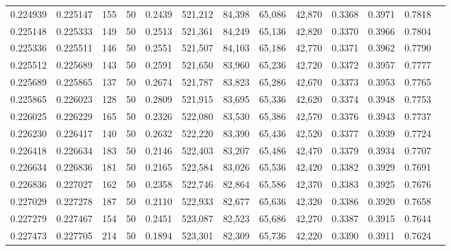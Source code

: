 \begin{tabular}{rrrrrrrrrrrrr}
0.224939 & 0.225147 &   155 &  50 &                                     0.2439 & 521,212 &  84,398 &  65,086 &  42,870 & 0.3368 & 0.3971 & 0.7818 \\
0.225148 & 0.225333 &   149 &  50 &                                     0.2513 & 521,361 &  84,249 &  65,136 &  42,820 & 0.3370 & 0.3966 & 0.7804 \\
0.225336 & 0.225511 &   146 &  50 &                                     0.2551 & 521,507 &  84,103 &  65,186 &  42,770 & 0.3371 & 0.3962 & 0.7790 \\
0.225512 & 0.225689 &   143 &  50 &                                     0.2591 & 521,650 &  83,960 &  65,236 &  42,720 & 0.3372 & 0.3957 & 0.7777 \\
0.225689 & 0.225865 &   137 &  50 &                                     0.2674 & 521,787 &  83,823 &  65,286 &  42,670 & 0.3373 & 0.3953 & 0.7765 \\
0.225865 & 0.226023 &   128 &  50 &                                     0.2809 & 521,915 &  83,695 &  65,336 &  42,620 & 0.3374 & 0.3948 & 0.7753 \\
0.226025 & 0.226229 &   165 &  50 &                                     0.2326 & 522,080 &  83,530 &  65,386 &  42,570 & 0.3376 & 0.3943 & 0.7737 \\
0.226230 & 0.226417 &   140 &  50 &                                     0.2632 & 522,220 &  83,390 &  65,436 &  42,520 & 0.3377 & 0.3939 & 0.7724 \\
0.226418 & 0.226634 &   183 &  50 &                                     0.2146 & 522,403 &  83,207 &  65,486 &  42,470 & 0.3379 & 0.3934 & 0.7707 \\
0.226634 & 0.226836 &   181 &  50 &                                     0.2165 & 522,584 &  83,026 &  65,536 &  42,420 & 0.3382 & 0.3929 & 0.7691 \\
0.226836 & 0.227027 &   162 &  50 &                                     0.2358 & 522,746 &  82,864 &  65,586 &  42,370 & 0.3383 & 0.3925 & 0.7676 \\
0.227029 & 0.227278 &   187 &  50 &                                     0.2110 & 522,933 &  82,677 &  65,636 &  42,320 & 0.3386 & 0.3920 & 0.7658 \\
0.227279 & 0.227467 &   154 &  50 &                                     0.2451 & 523,087 &  82,523 &  65,686 &  42,270 & 0.3387 & 0.3915 & 0.7644 \\
0.227473 & 0.227705 &   214 &  50 &                                     0.1894 & 523,301 &  82,309 &  65,736 &  42,220 & 0.3390 & 0.3911 & 0.7624 \\

\end{tabular}
